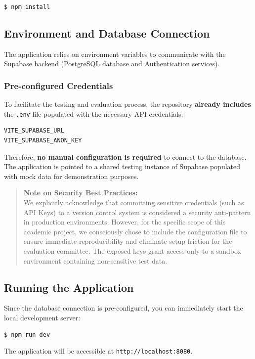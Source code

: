 \begin{verbatim}
$ npm install
\end{verbatim}

\subsection{Environment and Database Connection}

The application relies on environment variables to communicate with the Supabase backend (PostgreSQL database and Authentication services).

\subsubsection{Pre-configured Credentials}
To facilitate the testing and evaluation process, the repository \textbf{already includes} the \texttt{.env} file populated with the necessary API credentials:

\begin{verbatim}
VITE_SUPABASE_URL
VITE_SUPABASE_ANON_KEY
\end{verbatim}

Therefore, \textbf{no manual configuration is required} to connect to the database. The application is pointed to a shared testing instance of Supabase populated with mock data for demonstration purposes.

\begin{quotation}
\textbf{Note on Security Best Practices:} \\
We explicitly acknowledge that committing sensitive credentials (such as API Keys) to a version control system is considered a security anti-pattern in production environments. 
However, for the specific scope of this academic project, we consciously chose to include the configuration file to ensure immediate reproducibility and eliminate setup friction for the evaluation committee. The exposed keys grant access only to a sandbox environment containing non-sensitive test data.
\end{quotation}

\subsection{Running the Application}
Since the database connection is pre-configured, you can immediately start the local development server:

\begin{verbatim}
$ npm run dev
\end{verbatim}

The application will be accessible at \texttt{http://localhost:8080}.
